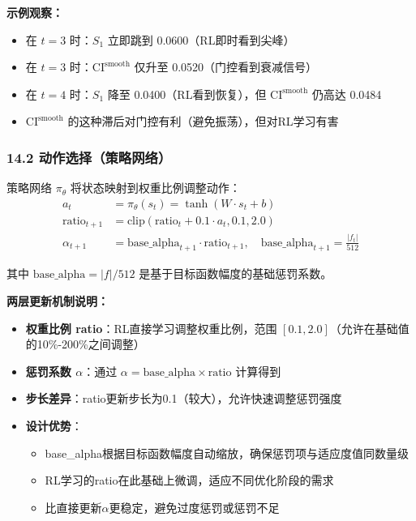 \documentclass[11pt,a3paper]{ctexart}
\begin{document}
\textbf{示例观察：}
\begin{itemize}
    \item 在 $t=3$ 时：$S_1$ 立即跳到 0.0600（RL即时看到尖峰）
    \item 在 $t=3$ 时：$\text{CI}^{\text{smooth}}$ 仅升至 0.0520（门控看到衰减信号）
    \item 在 $t=4$ 时：$S_1$ 降至 0.0400（RL看到恢复），但 $\text{CI}^{\text{smooth}}$ 仍高达 0.0484
    \item $\text{CI}^{\text{smooth}}$ 的这种滞后对门控有利（避免振荡），但对RL学习有害
\end{itemize}

\subsubsection*{14.2 动作选择（策略网络）}
策略网络 $\pi_\theta$ 将状态映射到权重比例调整动作：
\begin{align}
a_t &= \pi_\theta(s_t) = \tanh(W \cdot s_t + b) \\
\text{ratio}_{t+1} &= \text{clip}(\text{ratio}_t + 0.1 \cdot a_t, 0.1, 2.0) \\
\alpha_{t+1} &= \text{base\_alpha}_{t+1} \cdot \text{ratio}_{t+1},\quad \text{base\_alpha}_{t+1}=\frac{|f_t|}{512}
\end{align}

其中 $\text{base\_alpha} = |f| / 512$ 是基于目标函数幅度的基础惩罚系数。

\textbf{两层更新机制说明：}
\begin{itemize}
    \item \textbf{权重比例 ratio}：RL直接学习调整权重比例，范围 $[0.1, 2.0]$（允许在基础值的10\%-200\%之间调整）
    \item \textbf{惩罚系数 $\alpha$}：通过 $\alpha = \text{base\_alpha} \times \text{ratio}$ 计算得到
    \item \textbf{步长差异}：ratio更新步长为0.1（较大），允许快速调整惩罚强度
    \item \textbf{设计优势}：
    \begin{itemize}
        \item base\_alpha根据目标函数幅度自动缩放，确保惩罚项与适应度值同数量级
        \item RL学习的ratio在此基础上微调，适应不同优化阶段的需求
        \item 比直接更新$\alpha$更稳定，避免过度惩罚或惩罚不足
    \end{itemize}
\end{itemize}
\end{document}

